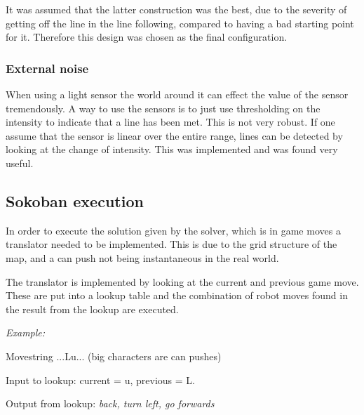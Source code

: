It was assumed that the latter construction was the best, due to the severity of getting off the line in the line following, compared to having a bad starting point for it. Therefore this design was chosen as the final configuration.

\subsubsection{External noise}
When using a light sensor the world around it can effect the value of the sensor tremendously.
A way to use the sensors is to just use thresholding on the intensity to indicate that a line has been met.
This is not very robust.
If one assume that the sensor is linear over the entire range, lines can be detected by looking at the change of intensity.
This was implemented and was found very useful.

\subsection{Sokoban execution}

In order to execute the solution given by the solver, which is in game moves a translator needed to be implemented. This is due to the grid structure of the map, and a can push not being instantaneous in the real world.

The translator is implemented by looking at the current and previous game move. These are put into a lookup table and the combination of robot moves found in the result from the lookup are executed. 

\vspace{10pt}
{\large \textit{Example:}} 

\noindent
Movestring ...Lu... (big characters are can pushes)

\noindent
Input to lookup: current = u, previous = L.

\noindent
Output from lookup: \textit{back, turn left, go forwards}

